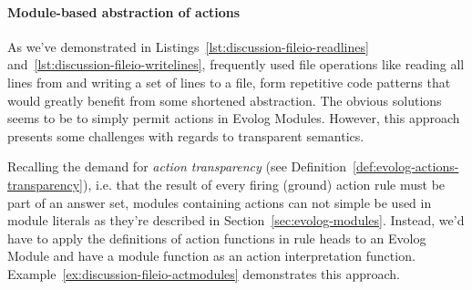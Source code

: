 \paragraph{Module-based abstraction of actions}
As we've demonstrated in Listings~\ref{lst:discussion-fileio-readlines} and~\ref{lst:discussion-fileio-writelines}, frequently used file operations like reading all lines from and writing a set of lines to a file, form repetitive code patterns that would greatly benefit from some shortened abstraction. The obvious solutions seems to be to simply permit actions in Evolog Modules. However, this approach presents some challenges with regards to transparent semantics.

Recalling the demand for \emph{action transparency} (see Definition~\ref{def:evolog-actions-transparency}), i.e. that the result of every firing (ground) action rule must be part of an answer set, modules containing actions can not simple be used in module literals as they're described in Section~\ref{sec:evolog-modules}. Instead, we'd have to apply the definitions of action functions in rule heads to an Evolog Module and have a module function as an action interpretation function. Example~\ref{ex:discussion-fileio-actmodules} demonstrates this approach.

